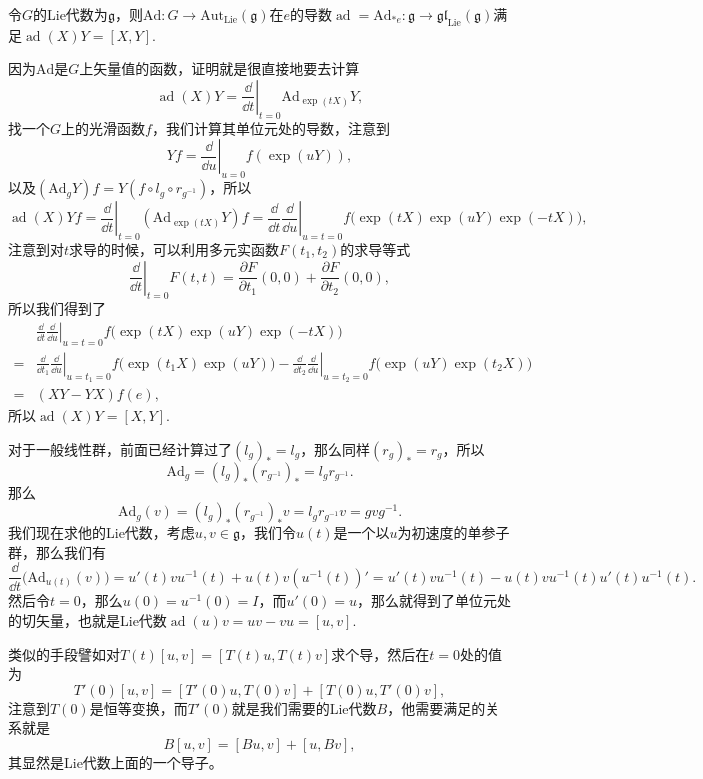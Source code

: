 \documentclass[9pt]{extarticle}
\newcommand{\lag}{{\mathfrak{g}}}
\DeclareMathOperator{\ad}{ad}
\begin{document}

\para 令$G$的Lie代数为$\lag$，则$\mathrm{Ad}:G\to \mathrm{Aut}_{\mathrm{Lie}}(\lag)$在$e$的导数$\ad=\mathrm{Ad}_{*e}:\lag\to \mathfrak{gl}_{\mathrm{Lie}}(\lag)$满足$\ad(X)Y=[X,Y]$.

因为$\mathrm{Ad}$是$G$上矢量值的函数，证明就是很直接地要去计算
\[
	\ad(X)Y=\left.\frac{\dd}{\dd t}\right|_{t=0}\mathrm{Ad}_{\exp(tX)}Y,
\]
找一个$G$上的光滑函数$f$，我们计算其单位元处的导数，注意到
\[
	Yf=\left.\frac{\dd}{\dd u}\right|_{u=0}f(\exp(uY)),
\]
以及$(\mathrm{Ad}_{g}Y)f=Y(f\circ l_g\circ r_{g^{-1}})$，所以
\[
	\ad(X)Yf=\left.\frac{\dd}{\dd t}\right|_{t=0}(\mathrm{Ad}_{\exp(tX)}Y)f=\left.\frac{\dd}{\dd t}\frac{\dd}{\dd u}\right|_{u=t=0}f\bigl(\exp(tX)\exp(uY)\exp(-tX)\bigr),
\]
注意到对$t$求导的时候，可以利用多元实函数$F(t_1,t_2)$的求导等式
\[
	\left.\frac{\dd}{\dd t}\right|_{t=0}F(t,t)=\frac{\partial F}{\partial t_1}(0,0)+\frac{\partial F}{\partial t_2}(0,0),
\]
所以我们得到了
\[
\begin{split}
	&\left.\frac{\dd}{\dd t}\frac{\dd}{\dd u}\right|_{u=t=0}f\bigl(\exp(tX)\exp(uY)\exp(-tX)\bigr)\\
	=&\left.\frac{\dd}{\dd t_1}\frac{\dd}{\dd u}\right|_{u=t_1=0}f\bigl(\exp(t_1X)\exp(uY)\bigr)-\left.\frac{\dd}{\dd t_2}\frac{\dd}{\dd u}\right|_{u=t_2=0}f\bigl(\exp(uY)\exp(t_2X)\bigr)\\
	=&(XY-YX)f(e),
\end{split}
\]
所以$\ad(X)Y=[X,Y]$.

\para 对于一般线性群，前面已经计算过了$(l_g)_*=l_g$，那么同样$(r_g)_*=r_g$，所以
\[
	\mathrm{Ad}_g=(l_g)_*(r_{g^{-1}})_*=l_gr_{g^{-1}}.
\]
那么
\[
	\mathrm{Ad}_g(v)=(l_g)_*(r_{g^{-1}})_*v=l_gr_{g^{-1}}v=gvg^{-1}.
\]
我们现在求他的Lie代数，考虑$u,v\in \lag$，我们令$u(t)$是一个以$u$为初速度的单参子群，那么我们有
\[
	\frac{\dd}{\dd t}\bigl(\mathrm{Ad}_{u(t)}(v)\bigr)=u'(t)vu^{-1}(t)+u(t)v(u^{-1}(t))'=u'(t)vu^{-1}(t)-u(t)vu^{-1}(t)u'(t)u^{-1}(t).
\]
然后令$t=0$，那么$u(0)=u^{-1}(0)=I$，而$u'(0)=u$，那么就得到了单位元处的切矢量，也就是Lie代数$\ad(u)v=uv-vu=[u,v]$.

类似的手段譬如对$T(t)[u,v]=[T(t)u,T(t)v]$求个导，然后在$t=0$处的值为
\[
	T'(0)[u,v]=[T'(0)u,T(0)v]+[T(0)u,T'(0)v],
\]
注意到$T(0)$是恒等变换，而$T'(0)$就是我们需要的Lie代数$B$，他需要满足的关系就是
\[
	B[u,v]=[Bu,v]+[u,Bv],
\]
其显然是Lie代数上面的一个导子。
\end{document}
